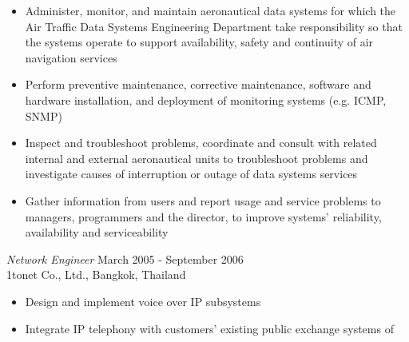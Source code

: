 \documentclass{res}
\begin{document}
\begin{resume}
\begin{itemize} \itemsep -2pt %
   \item Administer, monitor, and maintain aeronautical data systems for which the Air Traffic Data Systems Engineering Department take responsibility so that the systems operate to support availability, safety and continuity of air navigation services
   \item Perform preventive maintenance, corrective maintenance, software and hardware installation, and deployment of monitoring systems (e.g. ICMP, SNMP)
   \item Inspect and troubleshoot problems, coordinate and consult with related internal and external aeronautical units to troubleshoot problems and investigate causes of interruption or outage of data systems services
   \item Gather information from users and report usage and service problems to managers, programmers and the director, to improve systems' reliability, availability and serviceability
 \end{itemize}
 
{\sl Network Engineer} \hfill                  March 2005 - September 2006 \\
1tonet Co., Ltd., Bangkok, Thailand
  \begin{itemize} \itemsep -2pt
  \item Design and implement voice over IP subsystems
 \item  Integrate IP telephony with customers' existing public exchange systems of 
 \end{itemize}
 \newpage

\end{resume}
\end{document}
